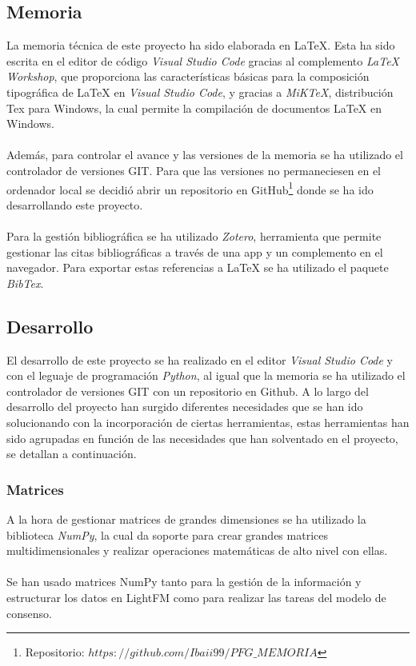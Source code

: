 \subsection{Memoria}
La memoria técnica de este proyecto ha sido elaborada en \LaTeX. Esta ha sido escrita en el editor de código \textit{Visual Studio Code} gracias al complemento \textit{LaTeX Workshop}, que proporciona las características básicas para la composición tipográfica de \LaTeX $ $ en \textit{Visual Studio Code}, y gracias a \textit{MiKTeX}, distribución Tex para Windows, la cual permite la compilación de documentos \LaTeX $ $ en Windows.
\\ \\
Además, para controlar el avance y las versiones de la memoria se ha utilizado el controlador de versiones GIT. Para que las versiones no permaneciesen en el ordenador local se decidió abrir un repositorio en GitHub\footnote{Repositorio: $https://github.com/Ibaii99/PFG\_MEMORIA$} donde se ha ido desarrollando este proyecto.
\\ \\
Para la gestión bibliográfica se ha utilizado \textit{Zotero}, herramienta que permite gestionar las citas bibliográficas a través de una app y un complemento en el navegador. Para exportar estas referencias a \LaTeX $ $ se ha utilizado el paquete \textit{BibTex}.
\subsection{Desarrollo}
El desarrollo de este proyecto se ha realizado en el editor \textit{Visual Studio Code} y con el leguaje de programación \textit{Python}, al igual que la memoria se ha utilizado el controlador de versiones GIT con un repositorio en Github. A lo largo del desarrollo del proyecto han surgido diferentes necesidades que se han ido solucionando con la incorporación de ciertas herramientas, estas herramientas han sido agrupadas en función de las necesidades que han solventado en el proyecto, se detallan a continuación.
\subsubsection{Matrices}
A la hora de gestionar matrices de grandes dimensiones se ha utilizado la biblioteca \textit{NumPy}, la cual da soporte para crear grandes matrices multidimensionales y realizar operaciones matemáticas de alto nivel con ellas. 
\\ \\
Se han usado matrices NumPy tanto para la gestión de la información y estructurar los datos en LightFM como para realizar las tareas del modelo de consenso.
